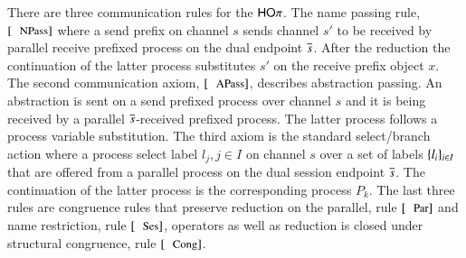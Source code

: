 

There are three communication rules for the $\mathsf{HO}\pi$. The name passing
rule, $\orule{NPass}$ where a send prefix on channel $s$ sends
channel $s'$ to be received by parallel receive prefixed process
on the dual endpoint $\overline{s}$. After the reduction the continuation of the 
latter process substitutes $s'$ on the receive prefix object $x$.
The second communication axiom, $\orule{APass}$, describes
abstraction passing. An abstraction is sent on a send prefixed process
over channel $s$ and it is being received by a parallel $\overline{s}$-received
prefixed process. The latter process follows a process variable
substitution.
The third axiom is the standard select/branch action where
a process select label $l_j, j \in I$ on channel $s$ over a set of
labels $\{l_i\}_{i \in I}$ that are offered from a parallel process
on the dual session endpoint $\overline{s}$. The continuation of the latter
process is the corresponding process $P_k$.
The last three rules are congruence rules that preserve reduction
on the parallel, rule $\orule{Par}$ and name restriction, rule $\orule{Ses}$,
operators as well as reduction is closed under structural congruence, rule $\orule{Cong}$.



